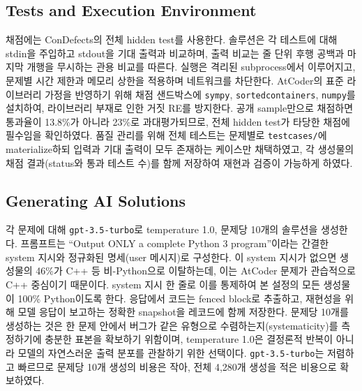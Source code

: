 \documentclass[10pt,conference]{IEEEtran}
\begin{document}
\subsection{Tests and Execution Environment}
채점에는 ConDefects의 전체 hidden test를 사용한다. 솔루션은 각 테스트에 대해 stdin을 주입하고 stdout을 기대 출력과 비교하며, 출력 비교는 줄 단위 후행 공백과 마지막 개행을 무시하는 관용 비교를 따른다. 실행은 격리된 subprocess에서 이루어지고, 문제별 시간 제한과 메모리 상한을 적용하며 네트워크를 차단한다. AtCoder의 표준 라이브러리 가정을 반영하기 위해 채점 샌드박스에 \texttt{sympy}, \texttt{sortedcontainers}, \texttt{numpy}를 설치하여, 라이브러리 부재로 인한 거짓 RE를 방지한다. 공개 sample만으로 채점하면 통과율이 13.8\%가 아니라 23\%로 과대평가되므로, 전체 hidden test가 타당한 채점에 필수임을 확인하였다. 품질 관리를 위해 전체 테스트는 문제별로 \texttt{testcases/}에 materialize하되 입력과 기대 출력이 모두 존재하는 케이스만 채택하였고, 각 생성물의 채점 결과(status와 통과 테스트 수)를 함께 저장하여 재현과 검증이 가능하게 하였다.

\subsection{Generating AI Solutions}
각 문제에 대해 \texttt{gpt-3.5-turbo}로 temperature 1.0, 문제당 10개의 솔루션을 생성한다. 프롬프트는 ``Output ONLY a complete Python 3 program''이라는 간결한 system 지시와 정규화된 명세(user 메시지)로 구성한다. 이 system 지시가 없으면 생성물의 46\%가 C++ 등 비-Python으로 이탈하는데, 이는 AtCoder 문제가 관습적으로 C++ 중심이기 때문이다. system 지시 한 줄로 이를 통제하여 본 설정의 모든 생성물이 100\% Python이도록 한다. 응답에서 코드는 fenced block로 추출하고, 재현성을 위해 모델 응답이 보고하는 정확한 snapshot을 레코드에 함께 저장한다. 문제당 10개를 생성하는 것은 한 문제 안에서 버그가 같은 유형으로 수렴하는지(systematicity)를 측정하기에 충분한 표본을 확보하기 위함이며, temperature 1.0은 결정론적 반복이 아니라 모델의 자연스러운 출력 분포를 관찰하기 위한 선택이다. \texttt{gpt-3.5-turbo}는 저렴하고 빠르므로 문제당 10개 생성의 비용은 작아, 전체 4{,}280개 생성을 적은 비용으로 확보하였다.
\end{document}
